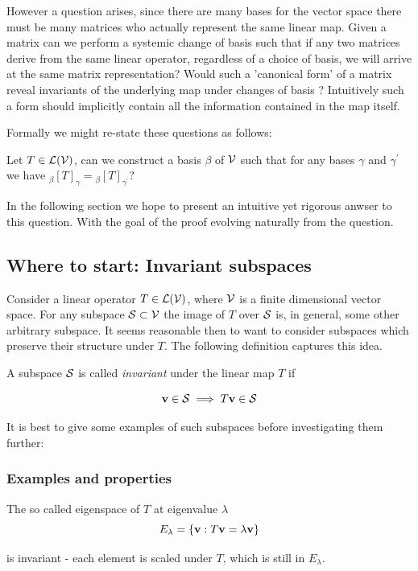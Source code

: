 However a question arises, since there are many bases for the vector space there must be many matrices who actually represent the same linear map. Given a matrix can we perform a systemic change of basis such that if any two matrices derive from the same linear operator, regardless of a choice of basis, we will arrive at the same matrix representation? Would such a 'canonical form' of a matrix reveal invariants of the underlying map under changes of basis ? Intuitively such a form should implicitly contain all the information contained in the map itself. 

Formally we might re-state these questions as follows:

Let \( T \in \mathcal{L}(\mathcal{V})\), can we construct a basis \(\beta\) of \(\mathcal{V}\) such that for any bases \(\gamma\) and \(\gamma^\prime\) we have \({}_{\beta}[T]_\gamma = {}_{\beta}[T]_{\gamma^\prime}\)?

In the following section we hope to present an intuitive yet rigorous anwser to this question. With the goal of the proof evolving naturally from the question.

\subsection{Where to start: Invariant subspaces} 
Consider a linear operator \( T \in \mathcal{L}(\mathcal{V}) \), where \(\mathcal{V}\) is a finite dimensional vector space.
For any subspace \(\mathcal{S} \subset \mathcal{V}\) the image of \(T\) over \(\mathcal{S}\) is, in general, some other arbitrary subspace.
It seems reasonable then to want to consider subspaces which preserve their structure under \( T \). The following definition captures this idea.

\begin{definition}
    A subspace \( \mathcal{S} \) is called \textit{invariant} under the linear map \( T \) if

    \begin{equation*}
        \mathbf{v} \in \mathcal{S} \implies T\mathbf{v}\in \mathcal{S}
    \end{equation*}
\end{definition}

It is best to give some examples of such subspaces before investigating them further:

\subsubsection{Examples and properties}

\begin{example}
    The so called eigenspace of \(T\) at eigenvalue \(\lambda\)
    \begin{equation*}
        E_\lambda = \{\mathbf{v}: T\mathbf{v}=\lambda \mathbf{v}\}
    \end{equation*}

    is invariant - each element is scaled under \(T\), which is still in \(E_\lambda\).
\end{example}


